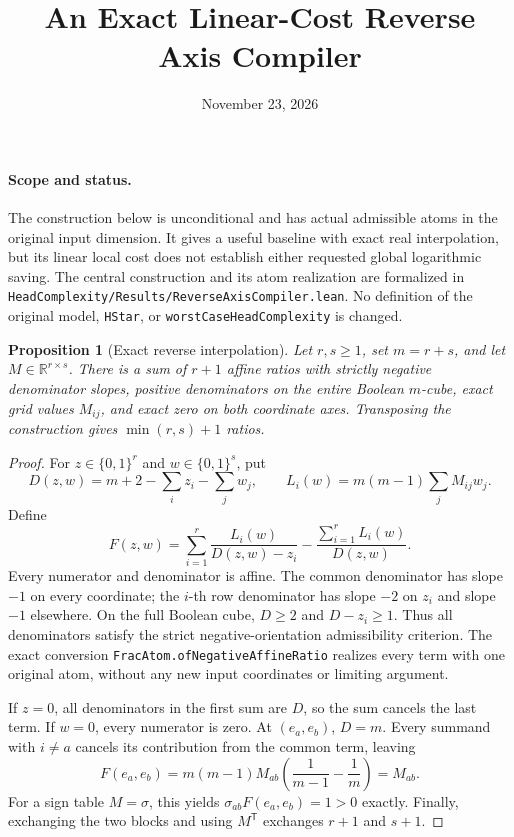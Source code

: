 \documentclass[11pt]{article}
\title{An Exact Linear-Cost Reverse Axis Compiler}
\author{}
\date{November 23, 2026}
\newtheorem{proposition}{Proposition}
\begin{document}
\maketitle

\paragraph{Scope and status.}
The construction below is unconditional and has actual admissible atoms in
the original input dimension. It gives a useful baseline with exact real
interpolation, but its linear local cost does not establish either requested
global logarithmic saving. The central construction and its atom realization
are formalized in
\texttt{HeadComplexity/Results/ReverseAxisCompiler.lean}.
No definition of the original model, \texttt{HStar}, or
\texttt{worstCaseHeadComplexity} is changed.

\begin{proposition}[Exact reverse interpolation]
Let $r,s\geq1$, set $m=r+s$, and let
$M\in\mathbb R^{r\times s}$. There is a sum of $r+1$ affine ratios
with strictly negative denominator slopes, positive denominators on the
entire Boolean $m$-cube, exact grid values $M_{ij}$, and exact zero on both
coordinate axes. Transposing the construction gives
$\min(r,s)+1$ ratios.
\end{proposition}
\begin{proof}
For $z\in\{0,1\}^r$ and $w\in\{0,1\}^s$, put
\[
 D(z,w)=m+2-\sum_i z_i-\sum_j w_j,
 \qquad L_i(w)=m(m-1)\sum_j M_{ij}w_j.
\]
Define
\[
 F(z,w)=\sum_{i=1}^r\frac{L_i(w)}{D(z,w)-z_i}
             -\frac{\sum_{i=1}^r L_i(w)}{D(z,w)}.
\]
Every numerator and denominator is affine. The common denominator has
slope $-1$ on every coordinate; the $i$-th row denominator has slope $-2$
on $z_i$ and slope $-1$ elsewhere. On the full Boolean cube,
$D\geq2$ and $D-z_i\geq1$. Thus all denominators satisfy the strict
negative-orientation admissibility criterion. The exact conversion
\texttt{FracAtom.ofNegativeAffineRatio} realizes every term with one
original atom, without any new input coordinates or limiting argument.

If $z=0$, all denominators in the first sum are $D$, so the sum cancels
the last term. If $w=0$, every numerator is zero. At $(e_a,e_b)$,
$D=m$. Every summand with $i\ne a$ cancels its contribution from the
common term, leaving
\[
 F(e_a,e_b)=m(m-1)M_{ab}
       \left(\frac1{m-1}-\frac1m\right)=M_{ab}.
\]
For a sign table $M=\sigma$, this yields
$\sigma_{ab}F(e_a,e_b)=1>0$ exactly. Finally, exchanging the two blocks
and using $M^{\mathsf T}$ exchanges $r+1$ and $s+1$.
\end{proof}
\end{document}
